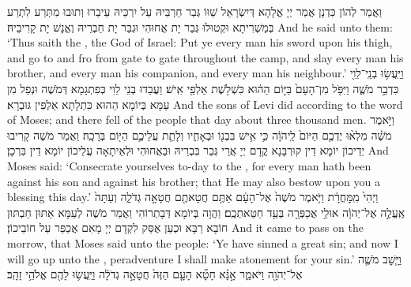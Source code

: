 {וַאֲמַר לְהוֹן כִּדְנָן אֲמַר יְיָ אֱלָהָא דְּיִשְׂרָאֵל שַׁוּוֹ גְּבַר חַרְבֵּיהּ עַל יִרְכֵּיהּ עֵיבַרוּ וְתוּבוּ מִתְּרַע לִתְרַע בְּמַשְׁרִיתָא וּקְטוּלוּ גְּבַר יָת אֲחוּהִי וּגְבַר יָת חַבְרֵיהּ וֶאֱנָשׁ יָת קָרִיבֵיהּ׃}
{And he said unto them: ‘Thus saith the \lord, the God of Israel: Put ye every man his sword upon his thigh, and go to and fro from gate to gate throughout the camp, and slay every man his brother, and every man his companion, and every man his neighbour.’}{}
{וַיַּֽעֲשׂ֥וּ בְנֵֽי־לֵוִ֖י כִּדְבַ֣ר מֹשֶׁ֑ה וַיִּפֹּ֤ל מִן־הָעָם֙ בַּיּ֣וֹם הַה֔וּא כִּשְׁלֹ֥שֶׁת אַלְפֵ֖י אִֽישׁ׃}
{וַעֲבַדוּ בְנֵי לֵוִי כְּפִתְגָמָא דְּמֹשֶׁה וּנְפַל מִן עַמָּא בְּיוֹמָא הַהוּא כִּתְלָתָא אַלְפִין גּוּבְרָא׃}
{And the sons of Levi did according to the word of Moses; and there fell of the people that day about three thousand men.}{}
{וַיֹּ֣אמֶר מֹשֶׁ֗ה מִלְא֨וּ יֶדְכֶ֤ם הַיּוֹם֙ לַֽיהֹוָ֔ה כִּ֛י אִ֥ישׁ בִּבְנ֖וֹ וּבְאָחִ֑יו וְלָתֵ֧ת עֲלֵיכֶ֛ם הַיּ֖וֹם בְּרָכָֽה׃
}
{וַאֲמַר מֹשֶׁה קָרִיבוּ יְדֵיכוֹן יוֹמָא דֵין קוּרְבָּנָא קֳדָם יְיָ אֲרֵי גְּבַר בִּבְרֵיהּ וּבַאֲחוּהִי וּלְאֵיתָאָה עֲלֵיכוֹן יוֹמָא דֵין בִּרְכָן׃}
{And Moses said: ‘Consecrate yourselves to-day to the \lord, for every man hath been against his son and against his brother; that He may also bestow upon you a blessing this day.’}{}
{וַיְהִי֙ מִֽמׇּחֳרָ֔ת וַיֹּ֤אמֶר מֹשֶׁה֙ אֶל־הָעָ֔ם אַתֶּ֥ם חֲטָאתֶ֖ם חֲטָאָ֣ה גְדֹלָ֑ה וְעַתָּה֙ אֶֽעֱלֶ֣ה אֶל־יְהֹוָ֔ה אוּלַ֥י אֲכַפְּרָ֖ה בְּעַ֥ד חַטַּאתְכֶֽם׃
}
{וַהֲוָה בְּיוֹמָא דְּבָתְרוֹהִי וַאֲמַר מֹשֶׁה לְעַמָּא אַתּוּן חַבְתּוּן חוֹבָא רַבָּא וּכְעַן אֶסַּק לִקְדָם יְיָ מָאִם אֲכַפַּר עַל חוֹבֵיכוֹן׃}
{And it came to pass on the morrow, that Moses said unto the people: ‘Ye have sinned a great sin; and now I will go up unto the \lord, peradventure I shall make atonement for your sin.’}{}
{וַיָּ֧שׇׁב מֹשֶׁ֛ה אֶל־יְהֹוָ֖ה וַיֹּאמַ֑ר אָ֣נָּ֗א חָטָ֞א הָעָ֤ם הַזֶּה֙ חֲטָאָ֣ה גְדֹלָ֔ה וַיַּֽעֲשׂ֥וּ לָהֶ֖ם אֱלֹהֵ֥י זָהָֽב׃
}

